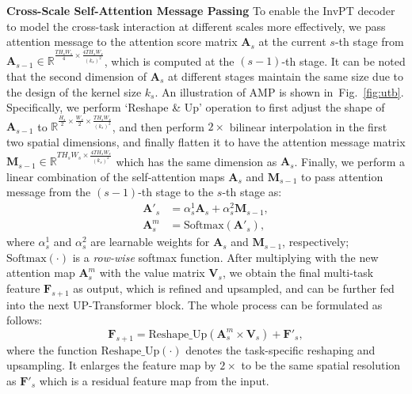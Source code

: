 \documentclass[runningheads]{llncs}
\begin{document}
\vspace{3pt}
\par\noindent\textbf{Cross-Scale Self-Attention Message Passing} To enable the InvPT decoder to model the cross-task interaction at different scales more effectively, we pass attention message to the attention score matrix $\mathbf{A}_s$ at the current $s$-th stage from $\mathbf{A}_{s-1} \in \mathbb{R}^{\frac{T H_s W_s}{4} \times \frac{4T H_s W_s}{(k_s)^2}}$, which is computed at the $(s-1)$-th stage. It can be noted that the second dimension of $\mathbf{A}_s$ at different stages maintain the same size due to the design of the kernel size $k_s$.
An illustration of AMP is shown in~Fig.~\ref{fig:utb}. Specifically, we perform `Reshape \& Up' operation to first adjust the shape of $\mathbf{A}_{s-1}$ to $\mathbb{R}^{\frac{H_s}{2}\times \frac{W_s}{2} \times \frac{TH_sW_s}{(k_s)^2}}$, and then perform $2\times$ bilinear interpolation in the first two spatial dimensions, and finally flatten it to have the attention message matrix $\mathbf{M}_{s-1} \in \mathbb{R}^{{T H_s W_s} \times \frac{4T H_s W_s}{(k_s)^2}}$ which has the same dimension as $\mathbf{A}_s$.
Finally, we perform a linear combination of the self-attention maps $\mathbf{A}_s$ and $\mathbf{M}_{s-1}$ to pass attention message from the $(s-1)$-th stage to the $s$-th stage as:
\begin{equation}\label{equ_attnMap}
\begin{aligned}
\mathbf{A}'_{s} &=  \alpha^1_s \mathbf{A}_{s} +  \alpha^2_s \mathbf{M}_{s-1},\\
\mathbf{A}_s^{m} &= \mathrm{Softmax} (\mathbf{A}'_s),
\end{aligned}
\end{equation}
where $\alpha^1_s$ and $\alpha^2_s$ are learnable weights for $\mathbf{A}_s$ and $\mathbf{M}_{s-1}$, respectively;
$\mathrm{Softmax(\cdot)}$ is a \emph{row-wise} softmax function. After multiplying with the new attention map $\mathbf{A}^{m}_s$ with the value matrix $\mathbf{V}_s$, we obtain the final multi-task feature $\mathbf{F}_{s+1}$ as output, which is refined and upsampled, and can be further fed into the next UP-Transformer block. The whole process can be formulated as follows:
\begin{equation}
\mathbf{F}_{s+1} = \text{Reshape\_Up}(\mathbf{A}^{m}_s \times \mathbf{V}_s) + \mathbf{F}'_s,
\end{equation}
where the function $\text{Reshape\_Up}(\cdot)$ denotes the task-specific reshaping and upsampling. It enlarges the feature map by $2\times$ to be the same spatial resolution as $\mathbf{F}'_s$ which is a residual feature map from the input.
\end{document}
